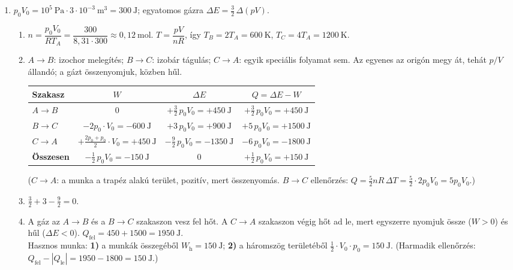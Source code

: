 \documentclass[11pt,a4paper]{article}
\begin{document}
\begin{enumerate}
\item $p_0V_0 = 10^5~\text{Pa}\cdot 3\cdot 10^{-3}~\text{m}^3 = 300~\text{J}$; egyatomos
  gázra $\Delta E = \tfrac32\,\Delta(pV)$.
  \begin{enumerate}
    \item $n = \dfrac{p_0V_0}{RT_A} = \dfrac{300}{8{,}31\cdot 300} \approx 0{,}12~\text{mol}$.\quad
      $T = \dfrac{pV}{nR}$, így $T_B = 2T_A = 600~\text{K}$, $T_C = 4T_A = 1200~\text{K}$.
    \item $A\to B$: izochor melegítés; $B\to C$: izobár tágulás; $C\to A$: egyik
      speciális folyamat sem. Az egyenes az origón megy át, tehát $p/V$ állandó; a gázt
      összenyomjuk, közben hűl.
      \begin{center}
      \renewcommand{\arraystretch}{1.45}
      \begin{tabular}{|l|c|c|c|}
      \hline
      Szakasz & $W$ & $\Delta E$ & $Q = \Delta E - W$ \\ \hline
      $A\to B$ & $0$ & $+\tfrac32\,p_0V_0 = +450~\text{J}$ & $+\tfrac32\,p_0V_0 = +450~\text{J}$ \\
      $B\to C$ & $-2p_0\cdot V_0 = -600~\text{J}$ & $+3\,p_0V_0 = +900~\text{J}$ & $+5\,p_0V_0 = +1500~\text{J}$ \\
      $C\to A$ & $+\tfrac{2p_0+p_0}{2}\cdot V_0 = +450~\text{J}$ & $-\tfrac92\,p_0V_0 = -1350~\text{J}$ & $-6\,p_0V_0 = -1800~\text{J}$ \\ \hline
      \textbf{Összesen} & $-\tfrac12\,p_0V_0 = -150~\text{J}$ & $0$ & $+\tfrac12\,p_0V_0 = +150~\text{J}$ \\ \hline
      \end{tabular}
      \end{center}
      ($C\to A$: a munka a trapéz alakú terület, pozitív, mert összenyomás.
      $B\to C$ ellenőrzés: $Q = \tfrac52 nR\,\Delta T = \tfrac52\cdot 2p_0V_0 = 5p_0V_0$.)
    \item $\tfrac32 + 3 - \tfrac92 = 0$. \checkmark
    \item A gáz az $A\to B$ és a $B\to C$ szakaszon vesz fel hőt. A $C\to A$ szakaszon
      végig hőt ad le, mert egyszerre nyomjuk össze ($W>0$) és hűl ($\Delta E<0$).
      $Q_\text{fel} = 450 + 1500 = 1950~\text{J}$.\\
      Hasznos munka: \textbf{1)} a munkák összegéből $W_\text{h} = 150~\text{J}$;
      \textbf{2)} a háromszög területéből $\tfrac12\cdot V_0\cdot p_0 = 150~\text{J}$.
      (Harmadik ellenőrzés: $Q_\text{fel} - |Q_\text{le}| = 1950 - 1800 = 150~\text{J}$.)\\

\end{enumerate}
\end{enumerate}
\end{document}
